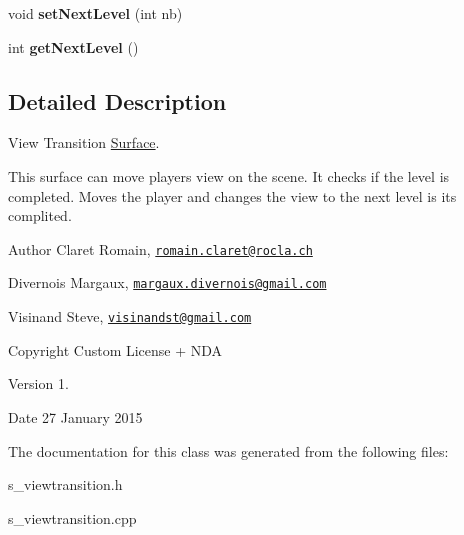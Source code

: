 \begin{DoxyCompactItemize}
\item 
\hypertarget{class_s___view_transition_a7aa555ea153a02bc957cce590c7f0660}{}void {\bfseries set\+Next\+Level} (int nb)\label{class_s___view_transition_a7aa555ea153a02bc957cce590c7f0660}

\item 
\hypertarget{class_s___view_transition_aef44e5819f80ec0689175510a7d50c37}{}int {\bfseries get\+Next\+Level} ()\label{class_s___view_transition_aef44e5819f80ec0689175510a7d50c37}

\end{DoxyCompactItemize}


\subsection{Detailed Description}
View Transition \hyperlink{class_surface}{Surface}. 

This surface can move player\textquotesingle{}s view on the scene. It checks if the level is completed. Moves the player and changes the view to the next level is it\textquotesingle{}s complited. \begin{DoxyAuthor}{Author}
Claret Romain, \href{mailto:romain.claret@rocla.ch}{\tt romain.\+claret@rocla.\+ch} 

Divernois Margaux, \href{mailto:margaux.divernois@gmail.com}{\tt margaux.\+divernois@gmail.\+com} 

Visinand Steve, \href{mailto:visinandst@gmail.com}{\tt visinandst@gmail.\+com} 
\end{DoxyAuthor}
\begin{DoxyCopyright}{Copyright}
Custom License + N\+D\+A 
\end{DoxyCopyright}
\begin{DoxyVersion}{Version}
1. 
\end{DoxyVersion}
\begin{DoxyDate}{Date}
27 January 2015 
\end{DoxyDate}


The documentation for this class was generated from the following files\+:\begin{DoxyCompactItemize}
\item 
s\+\_\+viewtransition.\+h\item 
s\+\_\+viewtransition.\+cpp\end{DoxyCompactItemize}
